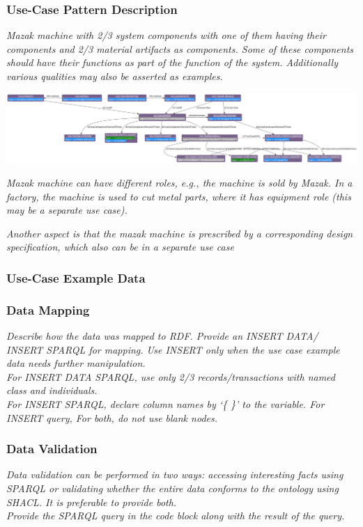 \subsubsection*{Use-Case Pattern Description}

\textit{Mazak machine with 2/3 system components with one of them having their components and 2/3 material artifacts as components. Some of these components should have their functions as part of the function of the system. Additionally various qualities may also be asserted as examples.}

\includegraphics[scale=0.22]{scenarios/engineered-system-artifact/images/mazak.png}
 
\textit{Mazak machine can have different roles, e.g., the machine is sold by Mazak. In a factory, the machine is used to cut metal parts, where it has equipment role (this may be a separate use case).}

\textit{Another aspect is that the mazak machine is prescribed by a corresponding design specification, which also can be in a separate use case}

\subsubsection*{Use-Case Example Data}

\subsubsection*{Data Mapping}
 \textit{ 
Describe how the data was mapped to RDF. Provide an INSERT DATA/ INSERT SPARQL for mapping. Use INSERT only when the use case example data needs further manipulation. \\
For INSERT DATA SPARQL, use only 2/3 records/transactions with named class and individuals. \\
For INSERT SPARQL, declare column names by `\{ \}' to the variable.  
For INSERT query, 
For both, do not use blank nodes.    
  }

\subsubsection*{Data Validation}
 \textit{ 
Data validation can be performed in two ways: accessing interesting facts using SPARQL or validating whether the entire data conforms to the ontology using SHACL. It is preferable to provide both. \\
Provide the SPARQL query in the code block along with the result of the query. \\
  }